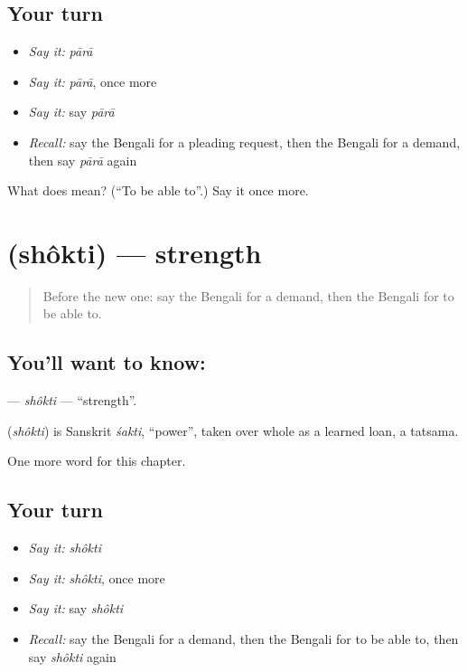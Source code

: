 \subsection*{Your turn}
\begin{itemize}
\raggedright
  \item \emph{Say it:} \emph{pārā}
  \item \emph{Say it:} \emph{pārā}, once more
  \item \emph{Say it:} say \emph{pārā}
  \item \emph{Recall:} say the Bengali for a pleading request, then the Bengali for a demand, then say \emph{pārā} again
\end{itemize}

\begin{tcolorbox}[breakable,colback=teal!4,colframe=teal!35!black,title={Before you move on}]
What does  mean? (\textquotedblleft{}To be able to\textquotedblright{}.) Say it once more.
\end{tcolorbox}
\section[\texorpdfstring{\bn{শক্তি} (shôkti)}{শক্তি (shôkti)}]{ (shôkti) — strength}

\label{lesson:BN-C98-shokti}



\begin{quote}
Before the new one: say the Bengali for a demand, then the Bengali for to be able to.
\end{quote}

\subsection*{You'll want to know: }
\textbf{} — \emph{shôkti} — \textquotedblleft{}strength\textquotedblright{}.

\begin{cousinweb}
\textbf{} (\emph{shôkti}) is Sanskrit \emph{śakti}, \textquotedblleft{}power\textquotedblright{}, taken over whole as a learned loan, a tatsama.
\end{cousinweb}

\begin{grammarlens}[title={What you've built}]
One more word for this chapter.
\end{grammarlens}

\subsection*{Your turn}
\begin{itemize}
\raggedright
  \item \emph{Say it:} \emph{shôkti}
  \item \emph{Say it:} \emph{shôkti}, once more
  \item \emph{Say it:} say \emph{shôkti}
  \item \emph{Recall:} say the Bengali for a demand, then the Bengali for to be able to, then say \emph{shôkti} again
\end{itemize}

